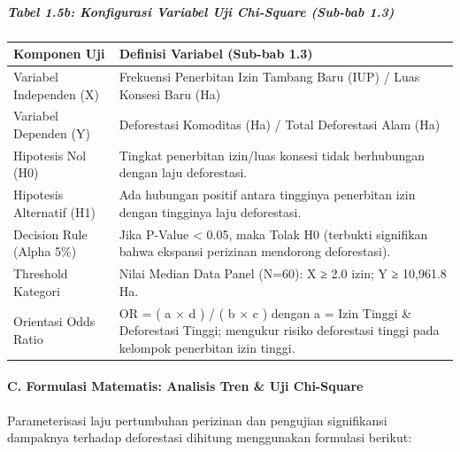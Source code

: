 \documentclass[
]{article}
\newcounter{none} %
\begin{document}
\subparagraph{Tabel 1.5b: Konfigurasi Variabel Uji Chi-Square (Sub-bab
1.3)}\label{tabel-1.5b-konfigurasi-variabel-uji-chi-square-sub-bab-1.3}

{\def\LTcaptype{none} %
\begin{longtable}[]{@{}
  >{\raggedright\arraybackslash}p{}
  >{\raggedright\arraybackslash}p{}@{}}
\toprule\noalign{}
\begin{minipage}[b]{\linewidth}\raggedright
Komponen Uji
\end{minipage} & \begin{minipage}[b]{\linewidth}\raggedright
Definisi Variabel (Sub-bab 1.3)
\end{minipage} \\
\midrule\noalign{}
\endhead
\bottomrule\noalign{}
\endlastfoot
Variabel Independen (X) & Frekuensi Penerbitan Izin Tambang Baru (IUP) /
Luas Konsesi Baru (Ha) \\
Variabel Dependen (Y) & Deforestasi Komoditas (Ha) / Total Deforestasi
Alam (Ha) \\
Hipotesis Nol (H0) & Tingkat penerbitan izin/luas konsesi tidak
berhubungan dengan laju deforestasi. \\
Hipotesis Alternatif (H1) & Ada hubungan positif antara tingginya
penerbitan izin dengan tingginya laju deforestasi. \\
Decision Rule (Alpha 5\%) & Jika P-Value \textless{} 0.05, maka Tolak H0
(terbukti signifikan bahwa ekspansi perizinan mendorong deforestasi). \\
Threshold Kategori & Nilai Median Data Panel (N=60): X ≥ 2.0 izin; Y ≥
10,961.8 Ha. \\
Orientasi Odds Ratio & OR = ( a × d ) / ( b × c ) dengan a = Izin Tinggi
\& Deforestasi Tinggi; mengukur risiko deforestasi tinggi pada kelompok
penerbitan izin tinggi. \\
\end{longtable}
}

\paragraph{C. Formulasi Matematis: Analisis Tren \& Uji
Chi-Square}\label{c.-formulasi-matematis-analisis-tren-uji-chi-square}

Parameterisasi laju pertumbuhan perizinan dan pengujian signifikansi
dampaknya terhadap deforestasi dihitung menggunakan formulasi berikut:
\end{document}

